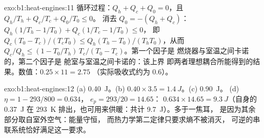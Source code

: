 \begin{solution}{exo:b1:heat-engines:11}
循环过程：$Q_h + Q_c + Q_0 = 0$，且 $Q_h/T_h + Q_c/T_c + Q_0/T_0 \leq 0$。
消去 $Q_0 = -(Q_h + Q_c)$：$Q_h(1/T_h - 1/T_0) + Q_c(1/T_c - 1/T_0) \leq 0$，
即 $Q_c(T_0 - T_c)/(T_cT_0) \leq Q_h(T_h - T_0)/(T_hT_0)$，从而
$Q_c/Q_h \leq (1 - T_0/T_h)\,T_c/(T_0 - T_c)$。第一个因子是
燃烧器与室温之间卡诺的，第二个因子是
舱室与室温之间卡诺的：该上界
即两者理想耦合所能得到的结果。数值：$0.25 \times 11 = 2.75$
（实际吸收式约为 $0.6$）。
\end{solution}

\begin{solution}{exo:b1:heat-engines:12}
(a) \qty{0.40}{J}。(b) $0.40 \times 3.5 = \qty{1.4}{J}$。(c) \qty{0.90}{J}。
(d)  $\eta = 1 - 293/800 = 0.634$， $e_p = 293/20 = 14.65$：
$0.634 \times 14.65 = \qty{9.3}{J}$（自身的 \qty{0.37}{J}
在 \qty{293}{K} 排出，也可用来供暖：共计 \qty{9.7}{J}）。多于一焦耳，
是因为其余部分取自室外空气：能量守恒，
而热力学第二定律只要求熵不被消灭，
可逆的串联系统恰好满足这一要求。
\end{solution}

